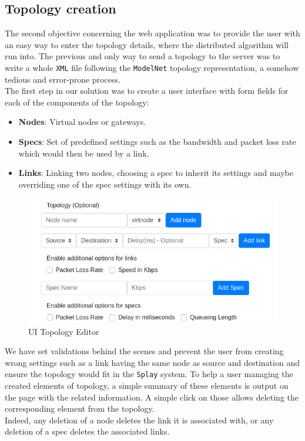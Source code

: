 \documentclass{eplmastersthesis}
\begin{document}
      \subsection{Topology creation}

        The second objective concerning the web application was to provide the
        user with an easy way to enter the topology details, where the distributed algorithm
        will run into. The previous and only way to send a topology
        to the server was to write a whole \texttt{XML} file following the \texttt{ModelNet}
        topology representation, a somehow tedious and error-prone process.\\

        The first step in our solution was to create a user interface with
        form fields for each of the components of the topology:

        \begin{itemize}
          \item \textbf{Nodes}: Virtual nodes or gateways.
          \item \textbf{Specs}: Set of predefined settings such as the
          bandwidth and packet loss rate which would then be used by
          a link.
          \item \textbf{Links}: Linking two nodes, choosing a spec to
          inherit its settings and maybe overriding one of the spec settings
          with its own.
        \end{itemize}

        \begin{figure}[H]
          \centering
          \includegraphics[scale=0.6]{figures/editor_topology.png}
          \caption{\label{editor_topology} UI Topology Editor}
        \end{figure}

        We have set validations behind the scenes and
        prevent the user from creating wrong settings such as a link having the
        same node as source and destination and ensure the topology would
        fit in the \texttt{Splay} system. To help a user managing the created
        elements of topology, a simple summary of these elements is
        output on the page with the related information. A simple click on those
        allows deleting the corresponding element from the topology.\\
        Indeed, any deletion of a node deletes the link it is associated
        with, or any deletion of a spec deletes the associated links.\\
\end{document}

